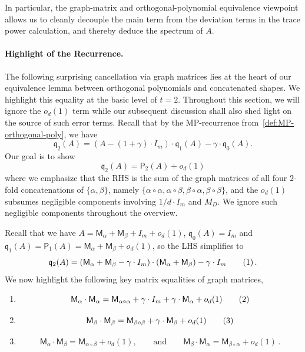 \documentclass[12pt]{article}
\def \al {\alpha}
\newcommand\numberthis{\addtocounter{equation}{1}\tag{\theequation}}
\newcommand{\gam}{\gamma}
\newcommand{\cm}{\mathsf{M} }
\newcommand{\fp}{\mathsf{P}}
\newcommand{\q}{\mathfrak q}
\newcommand{\Authornote}[3]{{\sf\footnotesize\color{#3}{[#1: #2]}}}
\newcommand{\Authornote}[3]{}
\newcommand{\anote}[1]{\Authornote{Aaron}{#1}{cyan}}
\begin{document}
In particular, the graph-matrix and
orthogonal-polynomial equivalence viewpoint allows us to cleanly decouple the main term from the deviation terms in the trace power calculation, and thereby deduce the spectrum of $A$.

\paragraph{Highlight of the Recurrence.}
The following surprising cancellation via graph matrices lies at the heart of our equivalence lemma between orthogonal polynomials and concatenated shapes. We highlight this equality at the basic level of $t=2$. Throughout this section, we will ignore the $o_d(1)$ term while our subsequent discussion shall also shed light on the source of such error terms. Recall that by the MP-recurrence from~\cref{def:MP-orthogonal-poly}, we have \[ 
\q_{2}(A) = (A - (1+\gamma) \cdot I_m )\cdot  \q_1(A) - \gam \cdot \q_0(A).
\]
Our goal is to show \[ 
\q_2(A) = \fp_2(A) +o_d(1)
\]
where we emphasize that the RHS is the sum of the graph matrices of all four $2$-fold concatenations of $\{\al,\beta\}$, namely $\{\al\circ \al, \al\circ \beta, \beta\circ \al, \beta\circ\beta \}$, and the $o_d(1)$ subsumes negligible components involving $1/d\cdot  I_m$ and $M_D$. We ignore such negligible components throughout the overview.
  
 Recall that we have $A = \cm_\al +\cm_\beta + I_m +o_d(1) $, $\q_0(A) = I_m $ and $\q_1(A) = \fp_1(A) = \cm_\al+\cm_\beta +o_d(1)$, so the LHS simplifies to \[ 
\q_2(A) =  (\cm_\al +\cm_\beta -\gam \cdot I_m) \cdot (\cm_\al +\cm_\beta) - \gam \cdot I_m  \numberthis  \label{eq:q2(A)} \,. 
\]
We now highlight the following key matrix equalities of graph matrices,\begin{enumerate}
	\item \[  \cm_\al \cdot \cm_\al = \cm _{\al \circ \al} +\gam \cdot I_m  +\gam \cdot \cm_\al +o_d(1)  \label{eq:al-al} \numberthis \]
	\item \[\cm_\beta \cdot \cm_\beta =  \cm _{\beta\circ\beta} + \gam \cdot \cm_\beta +o_d(1) \numberthis  \label{eq:beta-beta} \]
	\item \[ \cm_\al \cdot \cm_\beta  =  \cm_{\al\circ \beta} +o_d(1), \qquad \text{and} \qquad  \cm _{\beta}\cdot \cm_\al = \cm_{\beta\circ\al}+o_d(1)\,.  \]
\end{enumerate}
% 
 
\end{document}
